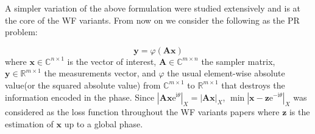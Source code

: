   A simpler variation of the above formulation were studied extensively and is at the core of the \ac{WF} variants. 
  From now on we consider the following as the \acl*{PR} problem:

  \begin{equation}\label{eq:main_function}
	\boldsymbol{y} = \varphi(\boldsymbol{A}\boldsymbol{x})
  \end{equation}
  where $\boldsymbol{x} \in \mathbb{C}^{n \times 1}$ is the vector of interest, $\boldsymbol{A} \in \mathbb{C}^{m \times n}$ the sampler matrix,  
  $\boldsymbol{y} \in \mathbb{R}^{m \times 1}$ the measurements vector, and $\varphi$ the usual element-wise absolute value(or the squared absolute value) from 
  $\mathbb{C}^{m \times 1}$ to $\mathbb{R}^{m \times 1}$ that destroys the information encoded in the phase. Since 
  $\left|\boldsymbol{A}\boldsymbol{x}\mathrm{e}^{\mathrm{i}\theta}\right|_X = \left|\boldsymbol{A}\boldsymbol{x}\right|_X$, 
  $\min \left|\boldsymbol{x}-\boldsymbol{z}\mathrm{e}^{-\mathrm{i}\theta}\right|_X$ was considered as the loss function throughout the \ac{WF} variants papers \cite{Candes2014}\cite{Chen2015}\cite{Kolte2016}\cite{Zhang2016} where $\boldsymbol{z}$ is the estimation of
  $\boldsymbol{x}$ up to a global phase.






